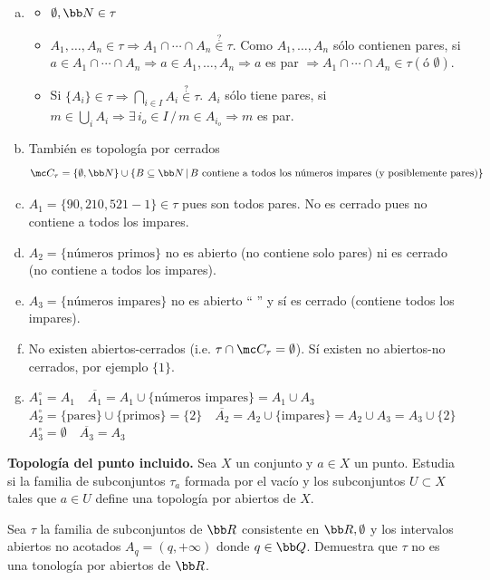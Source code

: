 \begin{sol}
    \begin{enumerate}[a)] \item
        \begin{itemize}
        \item $\emptyset , \bb N \in \tau$
        \item $A_1, \ldots, A_n \in \tau \Rightarrow A_1\cap \cdots \cap A_n \overset{?}{\in} \tau$. Como $A_1, \ldots, A_n$ s\'olo contienen pares, si $a\in A_1\cap \cdots \cap A_n \Rightarrow a \in A_1, \ldots, A_n \Rightarrow a$ es par $\Rightarrow A_1 \cap \cdots \cap A_n \in \tau (\text{\'o } \emptyset)$.
        \item Si $\{A_i\} \in \tau \Rightarrow \bigcap_{i \in I} A_i \overset{?}{\in} \tau$. $A_i$ s\'olo tiene pares, si $m \in \bigcup_i A_i \Rightarrow \exists \, i_o \in I \, / \, m \in A_{i_o} \Rightarrow m $ es par. 
        \end{itemize}
        \item Tambi\'en es topolog\'ia por cerrados
        $$\mc C_{\tau} = \{\emptyset, \bb N\} \cup \{B \subseteq \bb N \, | \, B \text{ contiene a todos los n\'umeros impares (y posiblemente pares)}\}$$
        \item $A_1 = \{90,210,521 -1\}\in \tau $ pues son todos pares. No es cerrado pues no contiene a todos los impares.
        \item $A_2 = \{\text{números primos}\}$ no es abierto (no contiene solo pares) ni es cerrado (no contiene a todos los impares).
        \item $A_3 = \{\text{números impares}\}$ no es abierto `` \quad '' y s\'i es cerrado (contiene todos los impares).
        \item No existen abiertos-cerrados (i.e. $\tau \cap \mc C_{\tau} =\emptyset$). S\'i existen no abiertos-no cerrados, por ejemplo $\{1\}$.
        \item $A_1^{\circ} = A_1 \quad \overline{A_1} = A_1 \cup \{\text{n\'umeros impares}\} = A_1 \cup A_3$ \\
        $A_2^{\circ} = \{\text{pares}\} \cup \{\text{primos}\} = \{2\} \quad \overline{A_2} = A_2 \cup \{\text{impares}\} = A_2 \cup A_3 = A_3 \cup \{2\}$\\ 
        $A_3 ^{\circ}= \emptyset \quad \overline{A_3} = A_3$
    \end{enumerate}
\end{sol}
\begin{ejer}
    [6] \textbf{Topología del punto incluido.} Sea $X$ un conjunto y $a \in X$ un punto. Estudia si la familia de subconjuntos $\tau_a$ formada por el vacío y los subconjuntos $U \subset X$ tales que $a \in U$ define una topología por abiertos de $X$.
\end{ejer}
\begin{ejer}
    [9] Sea $\tau$ la familia de subconjuntos de $\bb R$ consistente en $\bb R, \emptyset$ y los intervalos abiertos no acotados $A_q = (q, +\infty)$ donde $q\in \bb Q$. Demuestra que $\tau$ no es una tonología por abiertos de $\bb R$. 
\end{ejer}
